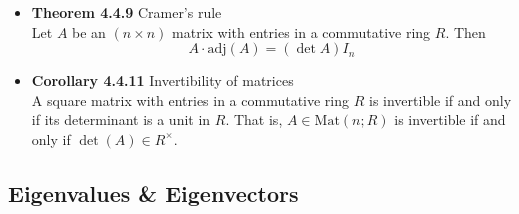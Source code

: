 \documentclass[11pt,a4paper]{article}
\begin{document}
\begin{itemize}
    \item \textbf{Theorem 4.4.9} Cramer's rule \\
        Let $A$ be an $(n \times n)$ matrix with entries in a commutative ring $R$.
        Then
        \[
            A \cdot \mathrm{adj}(A) = (\det A)I_n
        \]

    \item \textbf{Corollary 4.4.11} Invertibility of matrices \\
        A square matrix with entries in a commutative ring $R$ is invertible if and only if its
        determinant is a unit in $R$.
        That is, $A \in \mathrm{Mat}(n; R)$ is invertible if and only if
        $\det(A) \in R^\times$.

\end{itemize}

\subsection{Eigenvalues \& Eigenvectors}
\end{document}
